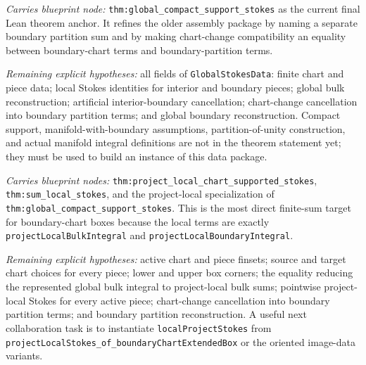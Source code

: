 \begin{definition}
  \label{anc:global_stokes_data}
  \leanok
  \emph{Carries blueprint node:}
  \texttt{thm:global\_compact\_support\_stokes} as the current final Lean
  theorem anchor.  It refines the older assembly package by naming a separate
  boundary partition sum and by making chart-change compatibility an equality
  between boundary-chart terms and boundary-partition terms.

  \emph{Remaining explicit hypotheses:}
  all fields of \texttt{GlobalStokesData}: finite chart and piece data; local
  Stokes identities for interior and boundary pieces; global bulk
  reconstruction; artificial interior-boundary cancellation; chart-change
  cancellation into boundary partition terms; and global boundary
  reconstruction.  Compact support, manifold-with-boundary assumptions,
  partition-of-unity construction, and actual manifold integral definitions are
  not in the theorem statement yet; they must be used to build an instance of
  this data package.
\end{definition}

\begin{definition}
  \label{anc:project_local_global_stokes}
  \leanok
  \emph{Carries blueprint nodes:}
  \texttt{thm:project\_local\_chart\_supported\_stokes},
  \texttt{thm:sum\_local\_stokes}, and the project-local specialization of
  \texttt{thm:global\_compact\_support\_stokes}.  This is the most direct
  finite-sum target for boundary-chart boxes because the local terms are
  exactly \texttt{projectLocalBulkIntegral} and
  \texttt{projectLocalBoundaryIntegral}.

  \emph{Remaining explicit hypotheses:}
  active chart and piece finsets; source and target chart choices for every
  piece; lower and upper box corners; the equality reducing the represented
  global bulk integral to project-local bulk sums; pointwise project-local
  Stokes for every active piece; chart-change cancellation into boundary
  partition terms; and boundary partition reconstruction.  A useful next
  collaboration task is to instantiate \texttt{localProjectStokes} from
  \texttt{projectLocalStokes\_of\_boundaryChartExtendedBox} or the oriented
  image-data variants.
\end{definition}

